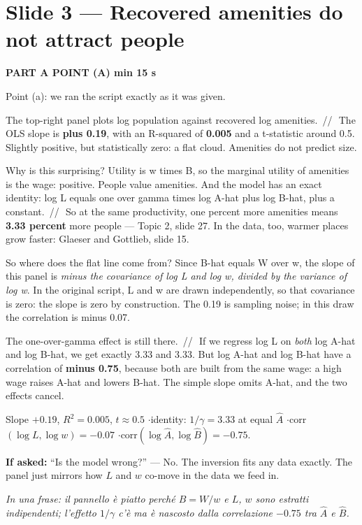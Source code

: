 \documentclass[11pt,a4paper]{article}
\newcommand{\slide}[3]{\Needspace{14\baselineskip}\section{#1}\textcolor{unicared}{\small\bfseries\MakeUppercase{#3}\quad\textperiodcentered\quad #2}\par}
\newcommand{\idea}[1]{\par{\small\itshape\color{unicablue}In una frase: #1}\par}
\newcommand{\pause}{\textcolor{unicared}{\,/\!/\,}}
\begin{document}
\slide{Slide 3 --- Recovered amenities do not attract people}{1 min 15 s}{Part A \textperiodcentered{} point (a)}

\begin{say}
Point (a): we ran the script exactly as it was given.

The top-right panel plots log population against recovered log amenities. \pause\ The OLS slope is \textbf{plus 0.19}, with an R-squared of \textbf{0.005} and a t-statistic around 0.5. Slightly positive, but statistically zero: a flat cloud. Amenities do not predict size.

Why is this surprising? Utility is w times B, so the marginal utility of amenities is the wage: positive. People value amenities. And the model has an exact identity: log L equals one over gamma times log A-hat plus log B-hat, plus a constant. \pause\ So at the same productivity, one percent more amenities means \textbf{3.33 percent} more people --- Topic 2, slide 27. In the data, too, warmer places grow faster: Glaeser and Gottlieb, slide 15.

So where does the flat line come from? Since B-hat equals W over w, the slope of this panel is \emph{minus the covariance of log L and log w, divided by the variance of log w}. In the original script, L and w are drawn independently, so that covariance is zero: the slope is zero by construction. The 0.19 is sampling noise; in this draw the correlation is minus 0.07.

The one-over-gamma effect is still there. \pause\ If we regress log L on \emph{both} log A-hat and log B-hat, we get exactly 3.33 and 3.33. But log A-hat and log B-hat have a correlation of \textbf{minus 0.75}, because both are built from the same wage: a high wage raises A-hat and lowers B-hat. The simple slope omits A-hat, and the two effects cancel.
\end{say}

\begin{nums}
Slope $+0.19$, $R^2 = 0.005$, $t\approx0.5$ \quad$\cdot$\quad identity: $1/\gamma = 3.33$ at equal $\hat A$ \quad$\cdot$\quad corr$(\log L,\log w) = -0.07$ \quad$\cdot$\quad corr$(\log\hat A,\log\hat B) = -0.75$.
\end{nums}
\begin{ask}
\textbf{If asked:} ``Is the model wrong?'' --- No. The inversion fits any data exactly. The panel just mirrors how $L$ and $w$ co-move in the data we feed in.
\end{ask}
\idea{il pannello è piatto perché $\hat B = W/w$ e $L$, $w$ sono estratti indipendenti; l'effetto $1/\gamma$ c'è ma è nascosto dalla correlazione $-0.75$ tra $\hat A$ e $\hat B$.}
\end{document}
